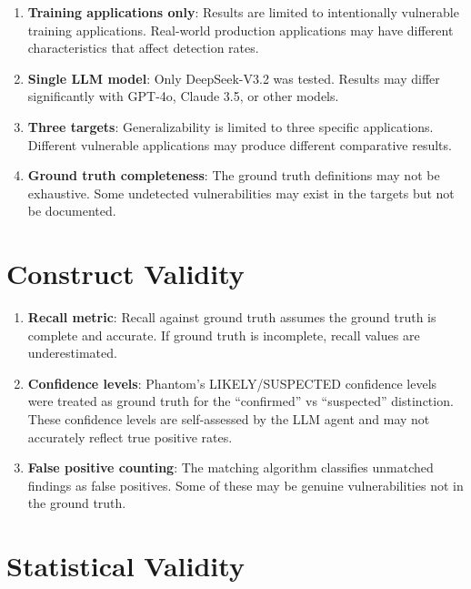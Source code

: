 \documentclass[12pt,a4paper,oneside]{book}
\begin{document}
\begin{enumerate}
    \item \textbf{Training applications only}: Results are limited to intentionally vulnerable training applications. Real-world production applications may have different characteristics that affect detection rates.
    
    \item \textbf{Single LLM model}: Only DeepSeek-V3.2 was tested. Results may differ significantly with GPT-4o, Claude 3.5, or other models.
    
    \item \textbf{Three targets}: Generalizability is limited to three specific applications. Different vulnerable applications may produce different comparative results.
    
    \item \textbf{Ground truth completeness}: The ground truth definitions may not be exhaustive. Some undetected vulnerabilities may exist in the targets but not be documented.
\end{enumerate}

\section{Construct Validity}

\begin{enumerate}
    \item \textbf{Recall metric}: Recall against ground truth assumes the ground truth is complete and accurate. If ground truth is incomplete, recall values are underestimated.
    
    \item \textbf{Confidence levels}: Phantom's LIKELY/SUSPECTED confidence levels were treated as ground truth for the ``confirmed'' vs ``suspected'' distinction. These confidence levels are self-assessed by the LLM agent and may not accurately reflect true positive rates.
    
    \item \textbf{False positive counting}: The matching algorithm classifies unmatched findings as false positives. Some of these may be genuine vulnerabilities not in the ground truth.
\end{enumerate}

\section{Statistical Validity}
\end{document}
